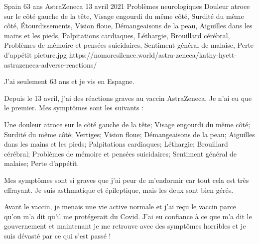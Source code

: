 {Spain}
{63 ans}
{AstraZeneca}
{13 avril 2021}
{ Problèmes neurologiques Douleur atroce sur le côté gauche de la tête, Visage
  engourdi du même côté, Surdité du même côté, Étourdissements, Vision floue,
  Démangeaisons de la peau, Aiguilles dans les mains et les pieds, Palpitations
  cardiaques, Léthargie, Brouillard cérébral, Problèmes de mémoire et pensées
  suicidaires, Sentiment général de malaise, Perte d'appétit}
{picture.jpg}
{https://nomoresilence.world/astra-zeneca/kathy-hyett-astrazeneca-adverse-reactions/}
{

J'ai seulement 63 ans et je vis en Espagne.

Depuis le 13 avril, j'ai des réactions graves au vaccin AstraZeneca. Je n'ai eu
que le premier. Mes symptômes sont les suivants :

Une douleur atroce sur le côté gauche de la tête; Visage engourdi du même côté;
Surdité du même côté; Vertiges; Vision floue; Démangeaisons de la peau;
Aiguilles dans les mains et les pieds; Palpitations cardiaques; Léthargie;
Brouillard cérébral; Problèmes de mémoire et pensées suicidaires; Sentiment
général de malaise; Perte d'appétit.

Mes symptômes sont si graves que j'ai peur de m'endormir car tout cela est très
effrayant. Je suis asthmatique et épileptique, mais les deux sont bien gérés.

Avant le vaccin, je menais une vie active normale et j'ai reçu le vaccin parce
qu'on m'a dit qu'il me protégerait du Covid. J'ai eu confiance à ce que m'a dit
le gouvernement et maintenant je me retrouve avec des symptômes horribles et je
suis dévasté par ce qui s'est passé !

}
